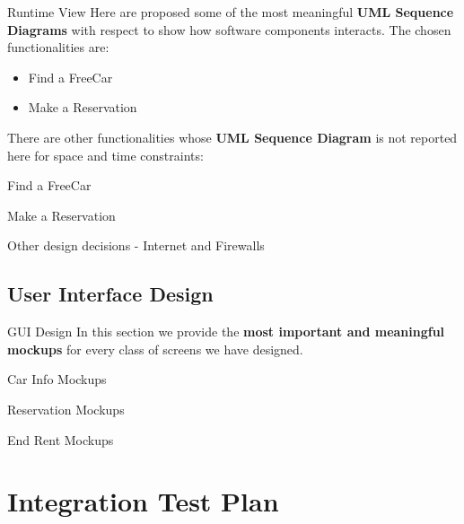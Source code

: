 \documentclass{../Common/Structure/pdf_presentation}
\begin{document}
	\begin{frame}{Runtime View}
		Here are proposed some of the most meaningful \textbf{UML Sequence Diagrams} with respect to show how software components interacts.
		The chosen functionalities are:
		\begin{itemize}
			\item Find a FreeCar
			\item Make a Reservation
		\end{itemize}
		There are other functionalities whose \textbf{UML Sequence Diagram} is not reported here for space and time constraints:
	\end{frame}
	\begin{frame}{Find a FreeCar}
	\end{frame}
	\begin{frame}{Make a Reservation}
	\end{frame}
	\begin{frame}{Other design decisions - Internet and Firewalls}

	\end{frame}

	\subsection{User Interface Design}
	\begin{frame}{GUI Design}
		In this section we provide the \textbf{most important and meaningful mockups} for every class of screens we have designed.
	\end{frame}
	\begin{frame}{Car Info Mockups}
	\end{frame}
	\begin{frame}{Reservation Mockups}
	\end{frame}
	\begin{frame}{End Rent Mockups}
	\end{frame}
	\section{Integration Test Plan}
\end{document}
